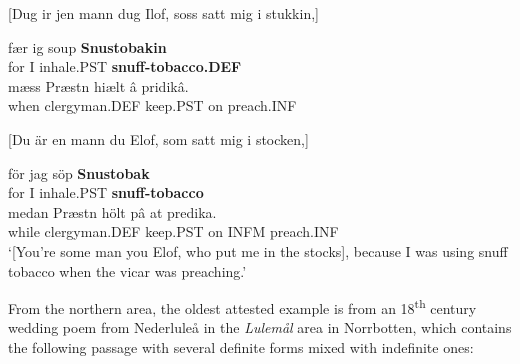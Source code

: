 

[Dug ir jen mann dug Ilof, soss satt mig i stukkin,]


 \ea\label{}
\gll fær  ig  soup  \textbf{Snustobakin}\\


for  I  inhale.PST  \textbf{snuff-tobacco.DEF}\\

 \ea\label{}
\gll mæss  Præstn  hiælt  â  pridikâ.\\


when  clergyman.DEF  keep.PST  on   preach.INF\\

\item 

\label{bkm:Ref139171019}\citet{Swedish1733}



[Du är en mann du Elof, som satt mig i stocken,]


 \ea\label{}
\gll för  jag  söp  \textbf{Snustobak}\\


for  I  inhale.PST  \textbf{snuff-tobacco}\\

 \ea\label{}
\gll medan  Præstn  hölt  pâ  at  predika.\\


while  clergyman.DEF  keep.PST  on   INFM  preach.INF\\

\glt  ‘[You’re some man you Elof, who put me in the stocks], because I was using snuff tobacco when the vicar was preaching.’

\z

From the northern area, the oldest attested example is from an 18\textsuperscript{th} century wedding poem from Nederluleå in the \textit{Lulemål} area in Norrbotten, which contains the following passage with several definite forms mixed with indefinite ones:

